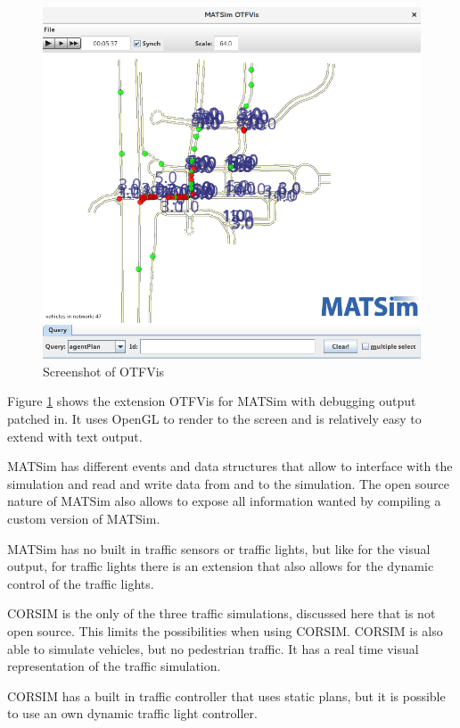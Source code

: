 \begin{figure}[!ht]
  \centering
  \includegraphics[width=12cm]{figures/otfvis}
  \caption[Screenshot of OTFVis]{Screenshot of OTFVis \protect\footnotemark}
  \label{otfvis}
\end{figure}


Figure \ref{otfvis} shows the extension OTFVis for MATSim with debugging output patched in. It uses OpenGL to render to the screen and is relatively easy to extend with text output.

MATSim has different events and data structures that allow to interface with the simulation and read and write data from and to the simulation. The open source nature of MATSim also allows to expose all information wanted by compiling a custom version of MATSim.

MATSim has no built in traffic sensors or traffic lights, but like for the visual output, for traffic lights there is an extension that also allows for the dynamic control of the traffic lights.

CORSIM is the only of the three traffic simulations, discussed here that is not open source. This limits the possibilities when using CORSIM. CORSIM is also able to simulate vehicles, but no pedestrian traffic. It has a real time visual representation of the traffic simulation.

CORSIM has a built in traffic controller that uses static plans, but it is possible to use an own dynamic traffic light controller.

